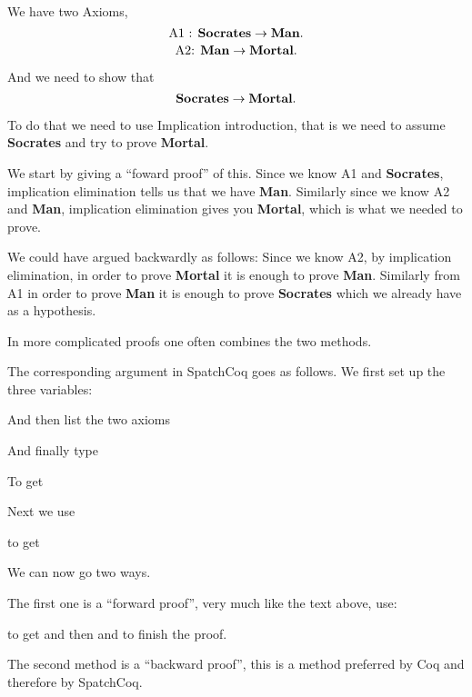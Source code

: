 \begin{itemize}
We have two Axioms, 
$$\mbox{A1 :  \bf Socrates} \rightarrow \mbox{\bf Man}.$$
$$\mbox{A2: \bf  Man} \rightarrow \mbox{\bf Mortal}.$$

And we need to show that $$\mbox{\bf Socrates} \rightarrow \mbox{\bf Mortal}.$$



To do that we need to use Implication introduction, that is we need to assume {\bf Socrates} and try to prove {\bf Mortal}. 

 We start by giving a ``foward proof'' of this. Since we know  A1 and {\bf Socrates}, implication elimination tells us that we have {\bf Man}. Similarly since we know A2 and {\bf Man}, implication elimination gives you {\bf Mortal}, which is what we needed to prove.

We could have argued backwardly as follows: Since we know A2, by implication elimination, in order to prove {\bf Mortal} it is enough to prove {\bf Man}. Similarly from A1 in order to prove {\bf Man} it is enough to prove {\bf Socrates} which we already have as a hypothesis.

In more complicated proofs one often combines the two methods.



The corresponding argument in SpatchCoq goes as follows. We first set up the three variables:


And then list the two axioms


And finally type

To get

Next we use

to get


We can now go two ways. 

The first one is a ``forward proof'', very much like the text above, use:

to get
and then 
and 
to finish the proof.

The second method is a ``backward proof'', this is a method preferred by Coq and therefore by SpatchCoq.


\end{itemize}
